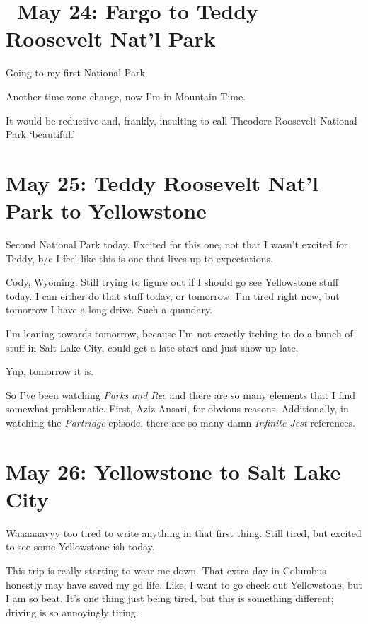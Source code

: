 \documentclass[../butidigress.tex]{subfiles}
\begin{document}
\section{\ May 24: Fargo to Teddy Roosevelt Nat'l Park}
Going to my first National Park.

\entryskip

Another time zone change, now I'm in Mountain Time.

It would be reductive and, frankly, insulting to call Theodore Roosevelt National Park `beautiful.'

\section{May 25: Teddy Roosevelt Nat'l Park to Yellowstone}
Second National Park today.
Excited for this one, not that I wasn't excited for Teddy, b/c I feel like this is one that lives up to expectations.

\entryskip

Cody, Wyoming.
Still trying to figure out if I should go see Yellowstone stuff today.
I can either do that stuff today, or tomorrow.
I'm tired right now, but tomorrow I have a long drive.
Such a quandary.

I'm leaning towards tomorrow, because I'm not exactly itching to do a bunch of stuff in Salt Lake City, could get a late start and just show up late.

Yup, tomorrow it is.

So I've been watching \textit{Parks and Rec} and there are so many elements that I find somewhat problematic.
First, Aziz Ansari, for obvious reasons.
Additionally, in watching the \textit{Partridge} episode, there are so many damn \textit{Infinite Jest} references.

\section{May 26: Yellowstone to Salt Lake City}

\entryskip

Waaaaaayyy too tired to write anything in that first thing.
Still tired, but excited to see some Yellowstone ish today.

This trip is really starting to wear me down.
That extra day in Columbus honestly may have saved my gd life.
Like, I want to go check out Yellowstone, but I am so beat.
It's one thing just being tired, but this is something different; driving is so annoyingly tiring.
\end{document}
